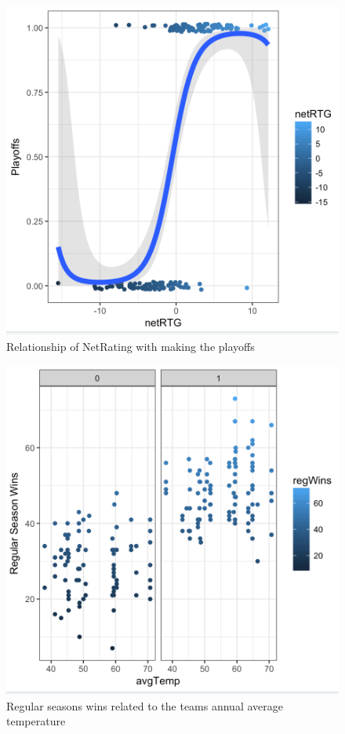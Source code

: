 \documentclass[12pt,english]{article}
\begin{document}

\begin{figure}[ht]
\caption{Relationship of NetRating with making the playoffs}
\includegraphics[scale=0.5]{Initial1.png}
\centering
\end{figure}

\begin{figure}[ht]
\caption{Regular seasons wins related to the teams annual average temperature }
\includegraphics[scale=0.5]{Initial2.png}
\centering
\end{figure}
\end{document}
